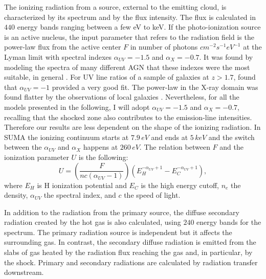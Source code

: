 \documentclass[../main.tex]{subfiles}
\begin{document}
The ionizing radiation from a source, external to the emitting cloud, is characterized by its spectrum and by the flux intensity. 
The flux is calculated in $440$ energy bands ranging between a few eV to keV.
If the photo-ionization source is an active nucleus, the input parameter that refers to the radiation field is the power-law flux from the active center $F$ in number of photons $\si{cm^{-2} s^{-1} eV^{-1}}$ at the Lyman limit with spectral indexes $\alpha_{UV}=-1.5$ and $\alpha_X=-0.7$.
It was found by modeling the spectra of many different AGN that these indexes were the most suitable, in general \citep[see, e.g.][ and references therein]{Contini83,Aldrovandi84,Rodriguez05}.
For UV line ratios of a sample of galaxies at $z> 1.7$, \citet{Villar97} found that $\alpha_{UV}=-1$ provided a very good fit.
The power-law in the X-ray domain was found flatter by the observations of local galaxies \citep[$\alpha_X=-1$, e.g.][]{Crenshaw02,Turner01}.
Nevertheless, for all the models presented in the following, I will adopt $\alpha_{UV}=-1.5$ and $\alpha_{X} = -0.7$, recalling that the shocked zone also contributes to the emission-line intensities.  
Therefore our results are less dependent on the shape of the ionizing radiation.
In SUMA the ionizing continuum starts at $7.9\,\si{eV}$ and ends at $5\,\si{keV}$ and the switch between the $\alpha_{UV}$ and $\alpha_X$ happens at $260\,\si{eV}$.
The relation between $F$ and the ionization parameter $U$ is the following: 
\begin{equation}
\label{eq:Umarc}
U= \left(\frac{F}{n c (\alpha_{UV} -1)}\right) \left(E_H^{-\alpha_{UV} +1} - E_C^{-\alpha_{UV} +1}\right),
\end{equation}
where $E_H$ is H ionization potential and $E_C$ is the high energy cutoff, $n_e$ the density, $\alpha_{UV}$ the spectral index, and $c$ the speed of light.

In addition to the radiation from the primary source, the diffuse secondary radiation created by the hot gas is also calculated, using $240$ energy bands for the spectrum.
The primary radiation source is independent but it affects the surrounding gas.
In contrast, the secondary diffuse radiation is emitted from the slabs of gas heated by the radiation flux reaching the gas and, in particular, by the shock.
Primary and secondary radiations are calculated by radiation transfer downstream.
\end{document}
